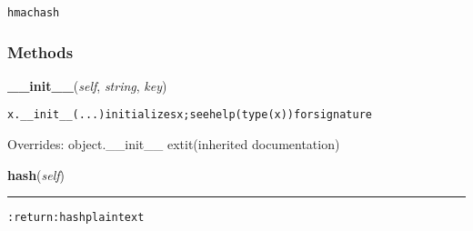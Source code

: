 \begin{alltt}
hmac hash 
\end{alltt}



  \subsubsection{Methods}

    \vspace{0.5ex}

\hspace{.8\funcindent}\begin{boxedminipage}{\funcwidth}

    \raggedright \textbf{\_\_init\_\_}(\textit{self}, \textit{string}, \textit{key})

\setlength{\parskip}{2ex}
\begin{alltt}
x.\_\_init\_\_(...) initializes x; see help(type(x)) for signature
\end{alltt}

\setlength{\parskip}{1ex}
      Overrides: object.\_\_init\_\_ 	extit{(inherited documentation)}

    \end{boxedminipage}

    \label{hal:maths:crypt:HMAC:hash}

    \vspace{0.5ex}

\hspace{.8\funcindent}\begin{boxedminipage}{\funcwidth}

    \raggedright \textbf{hash}(\textit{self})

    \vspace{-1.5ex}

    \rule{\textwidth}{0.5\fboxrule}
\setlength{\parskip}{2ex}
\begin{alltt}

:return: hash plaintext
\end{alltt}

\setlength{\parskip}{1ex}
    \end{boxedminipage}


